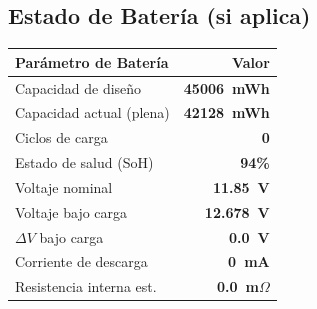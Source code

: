 \documentclass[11pt, a4paper, final]{article}
\newcommand{\mv}[1]{\textcolor{AMPrimary}{\textbf{#1}}}
\newcommand{\rowalt}{\rowcolor{AMLight}}
\newcommand{\thcell}[1]{\color{AMPrimary}\textbf{#1}}
\begin{document}
\vspace{0.6cm}


\subsection{Estado de Batería (si aplica)}


\begin{minipage}[t]{0.54\linewidth}
  \begin{tabularx}{\linewidth}{@{} X r @{}}
    \toprule
    \thcell{Parámetro de Batería} & \thcell{Valor} \\
    \midrule
    Capacidad de diseño         & \mv{45006\ mWh} \\
    \rowalt
    Capacidad actual (plena)    & \mv{42128\ mWh} \\
    Ciclos de carga             & \mv{0} \\
    \rowalt
    Estado de salud (SoH)       & \mv{94\%} \\
    Voltaje nominal             & \mv{11.85\ V} \\
    \rowalt
    Voltaje bajo carga          & \mv{12.678\ V} \\
    $\Delta V$ bajo carga       & \mv{0.0\ V} \\
    \rowalt
    Corriente de descarga       & \mv{0\ mA} \\
    Resistencia interna est.    & \mv{0.0\ m$\Omega$} \\
    \bottomrule
  \end{tabularx}
\end{minipage}%
\hfill
\end{document}

